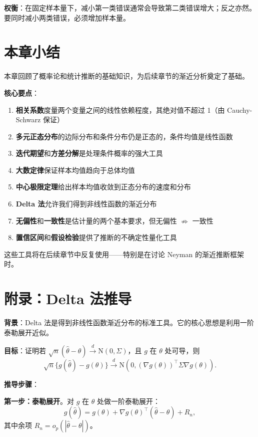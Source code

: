 \textbf{权衡}：在固定样本量下，减小第一类错误通常会导致第二类错误增大；反之亦然。要同时减小两类错误，必须增加样本量。

\section{本章小结}

本章回顾了概率论和统计推断的基础知识，为后续章节的渐近分析奠定了基础。

\textbf{核心要点}：
\begin{enumerate}
  \item \textbf{相关系数}度量两个变量之间的线性依赖程度，其绝对值不超过 1（由 Cauchy-Schwarz 保证）
  \item \textbf{多元正态分布}的边际分布和条件分布仍是正态的，条件均值是线性函数
  \item \textbf{迭代期望}和\textbf{方差分解}是处理条件概率的强大工具
  \item \textbf{大数定律}保证样本均值趋向于总体均值
  \item \textbf{中心极限定理}给出样本均值收敛到正态分布的速度和分布
  \item \textbf{Delta 法}允许我们得到非线性函数的渐近分布
  \item \textbf{无偏性}和\textbf{一致性}是估计量的两个基本要求，但无偏性 $\not\Rightarrow$ 一致性
  \item \textbf{置信区间}和\textbf{假设检验}提供了推断的不确定性量化工具
\end{enumerate}

这些工具将在后续章节中反复使用——特别是在讨论 Neyman 的渐近推断框架时。



\section{附录：Delta 法推导}\label{sec:appendix-delta-method}

\textbf{背景}：Delta 法是得到非线性函数渐近分布的标准工具。它的核心思想是利用一阶泰勒展开近似。

\textbf{目标}：证明若 $\sqrt{n}(\hat{\theta} - \theta) \xrightarrow{d} \mathrm{N}(0, \Sigma)$，且 $g$ 在 $\theta$ 处可导，则
\[
\sqrt{n}\{g(\hat{\theta}) - g(\theta)\} \xrightarrow{d} \mathrm{N}\left(0, (\nabla g(\theta))^\top \Sigma \nabla g(\theta)\right).
\]

\textbf{推导步骤}：

\textbf{第一步：泰勒展开}。对 $g$ 在 $\theta$ 处做一阶泰勒展开：
\[
g(\hat{\theta}) = g(\theta) + \nabla g(\theta)^\top (\hat{\theta} - \theta) + R_n,
\]
其中余项 $R_n = o_p(|\hat{\theta} - \theta|)$。

